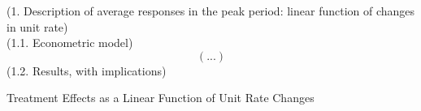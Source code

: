 (1. Description of average responses in the peak period: linear function of changes in unit rate) \\ 
(1.1. Econometric model) \\ 
\begin{equation}
    (...)
\end{equation}
(1.2. Results, with implications) \\ 
\begin{table}
    \caption{Treatment Effects as a Linear Function of Unit Rate Changes}
\end{table}

